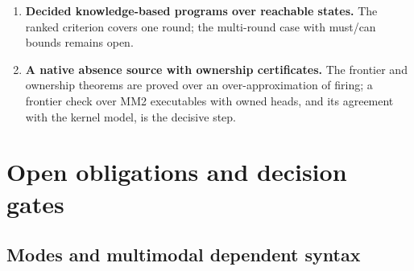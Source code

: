 \documentclass[11pt]{article}
\theoremstyle{definition}
\theoremstyle{remark}
\begin{document}
\begin{enumerate}
  confidence is derived through credal intervals
  (Section~\ref{sec:evidence-contracts}); the corner theorem covers the
  deduction map with point marginals $p_B$, $p_C$, where it is bilinear.  With
  interval-valued marginals the map divides by $1-p_B$ and the exact image of
  the box is not given by its corners in general.  The smallest decisive step
  is the exact envelope of the deduction map over the full box, or a corner
  theorem under a stated monotonicity condition.
\item \textbf{Decided knowledge-based programs over reachable states.}  The
  ranked criterion covers one round; the multi-round case with must/can
  bounds remains open.
\item \textbf{A native absence source with ownership certificates.}  The
  frontier and ownership theorems are proved over an over-approximation of
  firing; a frontier check over MM2 executables with owned heads, and its
  agreement with the kernel model, is the decisive step.
\end{enumerate}

\section{Open obligations and decision gates}
\label{sec:open-obligations}

\subsection{Modes and multimodal dependent syntax}
\end{document}
